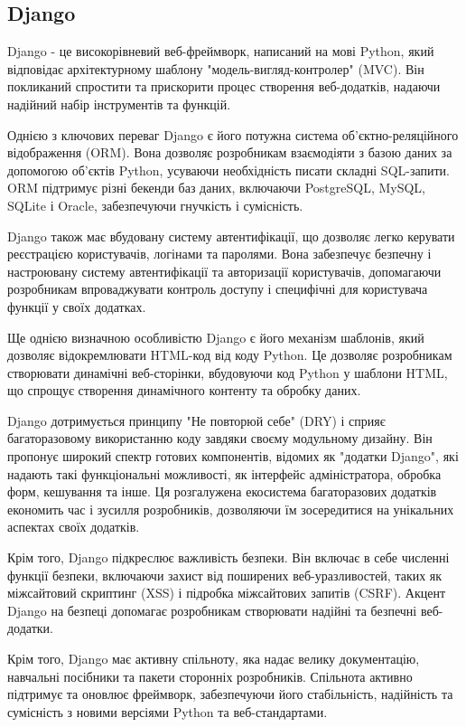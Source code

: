 \subsection{Django}
\label{subsec:django-subsection}

Django - це високорівневий веб-фреймворк, написаний на мові Python, який відповідає архітектурному шаблону "модель-вигляд-контролер" (MVC). Він покликаний спростити та прискорити процес створення веб-додатків, надаючи надійний набір інструментів та функцій.

Однією з ключових переваг Django є його потужна система об'єктно-реляційного відображення (ORM). Вона дозволяє розробникам взаємодіяти з базою даних за допомогою об'єктів Python, усуваючи необхідність писати складні SQL-запити. ORM підтримує різні бекенди баз даних, включаючи PostgreSQL, MySQL, SQLite і Oracle, забезпечуючи гнучкість і сумісність.

Django також має вбудовану систему автентифікації, що дозволяє легко керувати реєстрацією користувачів, логінами та паролями. Вона забезпечує безпечну і настроювану систему автентифікації та авторизації користувачів, допомагаючи розробникам впроваджувати контроль доступу і специфічні для користувача функції у своїх додатках.

Ще однією визначною особливістю Django є його механізм шаблонів, який дозволяє відокремлювати HTML-код від коду Python. Це дозволяє розробникам створювати динамічні веб-сторінки, вбудовуючи код Python у шаблони HTML, що спрощує створення динамічного контенту та обробку даних.

Django дотримується принципу "Не повторюй себе" (DRY) і сприяє багаторазовому використанню коду завдяки своєму модульному дизайну. Він пропонує широкий спектр готових компонентів, відомих як "додатки Django", які надають такі функціональні можливості, як інтерфейс адміністратора, обробка форм, кешування та інше. Ця розгалужена екосистема багаторазових додатків економить час і зусилля розробників, дозволяючи їм зосередитися на унікальних аспектах своїх додатків.

Крім того, Django підкреслює важливість безпеки. Він включає в себе численні функції безпеки, включаючи захист від поширених веб-уразливостей, таких як міжсайтовий скриптинг (XSS) і підробка міжсайтових запитів (CSRF). Акцент Django на безпеці допомагає розробникам створювати надійні та безпечні веб-додатки.

Крім того, Django має активну спільноту, яка надає велику документацію, навчальні посібники та пакети сторонніх розробників. Спільнота активно підтримує та оновлює фреймворк, забезпечуючи його стабільність, надійність та сумісність з новими версіями Python та веб-стандартами.

